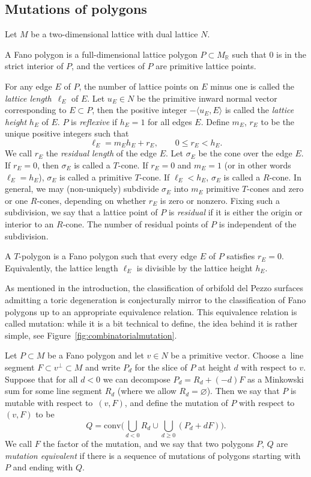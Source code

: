 \documentclass[pdftex]{sigma}
\numberwithin{equation}{section}
\newcommand{\RR}{\mathbb{R}}
\begin{document}
	\subsection{Mutations of polygons}\label{sec:mutationsofpolygons}
Let $M$ be a two-dimensional lattice with dual lattice $N$.
	\begin{Definition}\label{def:Fanopolygon}
		A Fano polygon is a full-dimensional lattice polygon $P \subset M_\RR$ such that $0$ is in the strict interior of $P$, and the vertices of $P$ are primitive lattice points.
	\end{Definition}
For any edge $E$ of $P$, the number of lattice points on $E$ minus one is called the \emph{lattice length}~$\ell_E$ of $E$. Let $u_E \in N$ be the primitive inward normal vector corresponding to $E \subset P$, then the positive integer $-\langle u_E, E \rangle$ is called the \emph{lattice height} $h_E$ of $E$.
$P$ is \emph{reflexive} if $h_E= 1$ for all edges $E$. Define $m_E$, $r_E$ to be the unique positive integers such that
\[
\ell_E=m_Eh_E+r_E, \qquad 0 \leq r_E<h_E.
\]
We call $r_E$ the \emph{residual length} of the edge $E$. Let $\sigma_E$ be the cone over the edge $E$.
If $r_E=0$, then $\sigma_E$ is called a $T$-cone. If $r_E=0$ and $m_E=1$ (or in other words $\ell_E=h_E$), $\sigma_E$ is called a primitive $T$-cone. If $\ell_E<h_E$, $\sigma_E$ is called a $R$-cone.
In general, we may (non-uniquely) subdivide $\sigma_E$ into $m_E$ primitive $T$-cones and zero or one $R$-cones, depending on whether $r_E$ is zero or nonzero.
Fixing such a subdivision, we say that a lattice point of $P$ is \emph{residual} if it is either the origin or interior to an $R$-cone. The number of residual points of $P$ is independent of the subdivision.
	\begin{Definition}
	A $T$-polygon is a Fano polygon such that every edge $E$ of $P$ satisfies $r_E=0$. Equivalently, the lattice length $\ell_E$ is divisible by the lattice height $h_E$.
\end{Definition}
As mentioned in the introduction, the classification of orbifold del Pezzo surfaces admitting a toric degeneration is conjecturally mirror to the classification of Fano polygons up to an appropriate equivalence relation. This equivalence relation is called mutation: while it is a bit technical to define, the idea behind it is rather simple, see Figure~\ref{fig:combinatorialmutation}.
	\begin{Definition}\label{mutationdef}
		Let $P \subset M$ be a Fano polygon and let $v \in N$ be a primitive vector. Choose a~line segment $F \subset v^{\perp} \subset M$ and write $P_d$
		for the slice of $P$ at height $d$ with respect to $v$. Suppose that for all $d<0$ we can decompose $P_d=R_d+(-d)F$ as a Minkowski sum for
		some line segment $R_d$ (where we allow $R_d =\varnothing$).
		Then we say that $P$ is mutable with respect to~$(v, F)$, and define the mutation of $P$ with respect to $(v, F)$ to be
		\[
		Q=\text{conv} \biggl( \bigcup_{d<0} R_d \cup \bigcup_{d\geq 0}(P_d+dF) \biggr).
		\]
		We call $F$ the factor of the mutation, and we say that two polygons $P$, $Q$ are {\it mutation equivalent} if there is a sequence of mutations
		of polygons starting with $P$ and ending with $Q$.
	\end{Definition}
\end{document}
